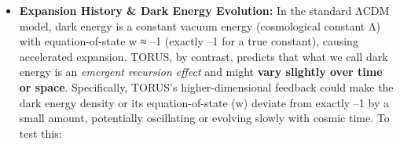 \documentclass[
]{article}
\begin{document}
\begin{itemize}
\item
  \textbf{Expansion History \& Dark Energy Evolution:} In the standard
  ΛCDM model, dark energy is a constant vacuum energy (cosmological
  constant Λ) with equation-of-state w ≈ --1 (exactly --1 for a true
  constant), causing accelerated expansion. TORUS, by contrast, predicts
  that what we call dark energy is an \emph{emergent recursion effect}
  and might \textbf{vary slightly over time or space}\hspace{0pt}.
  Specifically, TORUS's higher-dimensional feedback could make the dark
  energy density or its equation-of-state (w) deviate from exactly --1
  by a small amount, potentially oscillating or evolving slowly with
  cosmic time\hspace{0pt}. To test this:


\end{itemize}
\end{document}

